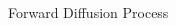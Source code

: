 \begin{frame}{Forward Diffusion Process}
\begin{columns}
\begin{column}{0.5\textwidth}
	
\end{column}

\end{columns}

\end{frame}

